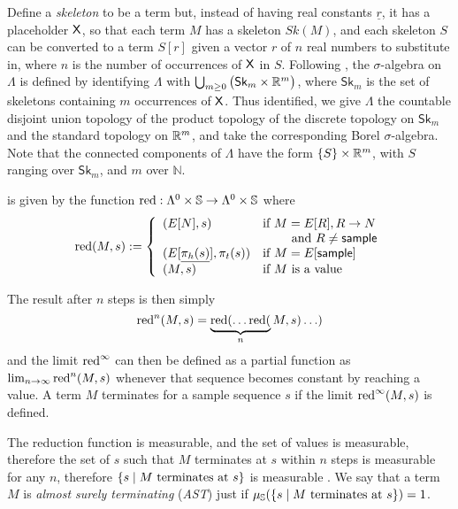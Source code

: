 Define a \emph{skeleton} to be a term but, instead of having real constants $\underline r$, it has a placeholder $\mathsf{X}$, so that each term $M$ has a skeleton $\mathit{Sk}(M)$, and each skeleton $S$ can be converted to a term $S[r]$ given a vector $r$ of $n$ real numbers to substitute in, where $n$ is the number of occurrences of $\mathsf{X}$ in $S$. 
Following \cite{DBLP:conf/icfp/BorgstromLGS16,DBLP:conf/lics/StatonYWHK16,DBLP:journals/pacmpl/EhrhardPT18}, the $\sigma$-algebra on $\Lambda$ is defined by identifying $\Lambda$ with $\bigcup_{m\geq 0} \big(\mathsf{Sk}_m \times \mathbb{R}^m \big)$, where $\mathsf{Sk}_m$ is the set of skeletons containing $m$ occurrences of $\mathsf{X}$.
Thus identified, we give $\Lambda$ the countable disjoint union topology of the product topology of the discrete topology on $\mathsf{Sk}_m$ and the standard topology on $\mathbb{R}^m$, and take the corresponding Borel $\sigma$-algebra.
Note that the connected components of $\Lambda$ have the form $\{S\} \times \mathbb{R}^m$, with $S$ ranging over $\mathsf{Sk}_m$, and $m$ over $\mathbb{N}$.

 is given by the function $\operatorname{red} : \Lambda^0 \times {\mathbb{S}} \to \Lambda^0 \times {\mathbb{S}}$ where
\begin{equation*}
\operatorname{red}(M,s) := \left\{
    \begin{array}{ll}
        (E[N],s) & \text{if } M = E[R], R \to N\\
        & \qquad \text{ and } R \neq \mathsf{sample} \\
        (E[\underline{\pi_h(s)}],\pi_t(s)) & \text{if } M = E[\mathsf{sample}] \\
        (M,s) & \text{if } M \text{ is a value}
    \end{array} \right .
\end{equation*}

The result after $n$ steps is then simply 
\[
\operatorname{red}^n(M,s) = \underbrace{\operatorname{red}(\ldots\operatorname{red}(}_n M,s)\ldots)
\] 
and the limit $\operatorname{red}^\infty$ can then be defined as a partial function as $\lim_{n \to \infty} \operatorname{red}^n(M,s)$ whenever that sequence becomes constant by reaching a value. A term $M$ terminates for a sample sequence $s$ if the limit $\operatorname{red}^\infty(M,s)$ is defined.

The reduction function is measurable, and the set of values is measurable, therefore the set of $s$ such that $M$ terminates at $s$ within $n$ steps is measurable for any $n$, therefore $\{s \mid \hbox{$M$ terminates at $s$}\}$ is measurable \cite{DBLP:conf/icfp/BorgstromLGS16,DBLP:conf/esop/MakOPW21}. 
We say that a term $M$ is \emph{almost surely terminating} (\emph{AST}) just if $\mu_{{\mathbb{S}}}(\{s \mid \hbox{$M$ terminates at $s$}\}) = 1$.

